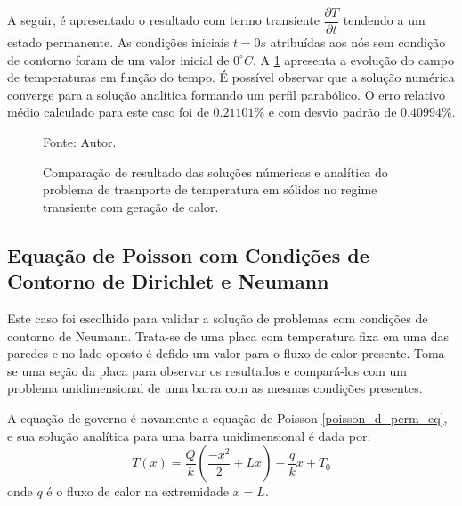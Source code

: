 A seguir, é apresentado o resultado com termo transiente $\dfrac{\partial T}{\partial t}$ tendendo a um estado permanente.
As condições iniciais $t=0s$ atribuídas aos nós sem condição de contorno foram de um valor inicial de $0^{\circ}C$.
A \ref{poisson_d_trans_comp} apresenta a evolução do campo de temperaturas em função do tempo.
É possível observar que a solução numérica converge para a solução analítica formando um perfil parabólico.
O erro relativo médio calculado para este caso foi de $0.21101\%$ e com desvio padrão de $0.40994\%$.
\begin{figure}[H]
    \centering
     {\raggedleft \scriptsize Fonte: Autor.}
    \caption{Comparação de resultado das soluções númericas e analítica do problema de trasnporte de temperatura em sólidos no regime transiente com geração de calor.}
    \label{poisson_d_trans_comp}
\end{figure}

\subsection{\textbf{Equação de Poisson com Condições de Contorno de Dirichlet e Neumann}}
\label{sec_poisson_neu}
Este caso foi escolhido para validar a solução de problemas com condições de contorno de Neumann.
Trata-se de uma placa com temperatura fixa em uma das paredes e no lado oposto é defido um valor para o fluxo de calor presente.
Toma-se uma seção da placa para observar os resultados e compará-los com um problema unidimensional de uma barra com as mesmas condições presentes.

A equação de governo é novamente a equação de Poisson \eqref{poisson_d_perm_eq}, e sua solução analítica para uma barra unidimensional é dada por:
\begin{equation}
    T(x) = \dfrac{Q}{k}\left(\dfrac{-x^2}{2} + L x\right) - \dfrac{q}{k} x + T_0
    \label{poisson_n_sol} 
\end{equation}
onde $q$ é o fluxo de calor na extremidade $x=L$.

